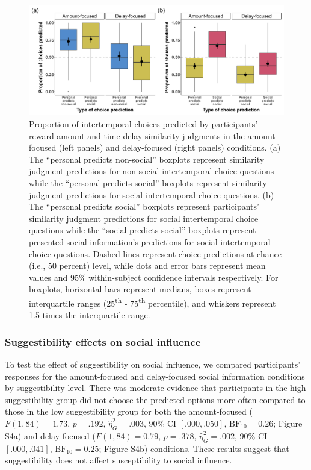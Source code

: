 \documentclass[
  pub,floatsintext]{apa6}
\begin{document}
\begin{figure}
\includegraphics[width=1\linewidth]{figures/sim_judgment_predictions_combined_2} \caption{Proportion of intertemporal choices predicted by participants' reward amount and time delay similarity judgments in the amount-focused (left panels) and delay-focused (right panels) conditions. (a) The ``personal predicts non-social'' boxplots represent similarity judgment predictions for non-social intertemporal choice questions while the ``personal predicts social'' boxplots represent similarity judgment predictions for social intertemporal choice questions. (b) The ``personal predicts social'' boxplots represent participants' similarity judgment predictions for social intertemporal choice questions while the ``social predicts social'' boxplots represent presented social information's predictions for social intertemporal choice questions. Dashed lines represent choice predictions at chance (i.e., 50 percent) level, while dots and error bars represent mean values and 95\% within-subject confidence intervals respectively. For boxplots, horizontal bars represent medians, boxes represent interquartile ranges (25\textsuperscript{th} - 75\textsuperscript{th} percentile), and whiskers represent 1.5 times the interquartile range.}\label{fig:simjudgmentsocialinfopredictions2}
\end{figure}

\hypertarget{suggestibility-effects-on-social-influence-1}{%
\subsubsection{Suggestibility effects on social influence}\label{suggestibility-effects-on-social-influence-1}}

To test the effect of suggestibility on social influence, we compared participants' responses for the amount-focused and delay-focused social information conditions by suggestibility level. There was moderate evidence that participants in the high suggestibility group did not choose the predicted options more often compared to those in the low suggestibility group for both the amount-focused (\(F(1, 84) = 1.73\), \(p = .192\), \(\hat{\eta}^2_G = .003\), 90\% CI \([.000, .050]\), \(\mathrm{BF}_{\textrm{10}} = 0.26\); Figure S4a) and delay-focused (\(F(1, 84) = 0.79\), \(p = .378\), \(\hat{\eta}^2_G = .002\), 90\% CI \([.000, .041]\), \(\mathrm{BF}_{\textrm{10}} = 0.25\); Figure S4b) conditions. These results suggest that suggestibility does not affect susceptibility to social influence.
\end{document}
